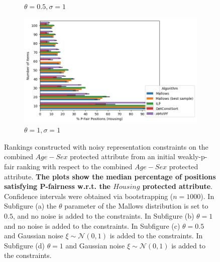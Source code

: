 \begin{figure}
\begin{subfigure}[b]{0.4\textwidth}
         \caption{$\theta = 0.5, \sigma=1$}
         \label{fig:01pfair}
     \end{subfigure}\quad
     \begin{subfigure}[b]{0.4\textwidth}
         \centering
         \includegraphics[width=\textwidth]{resources/11/p_pfair_hou.png}
         \caption{$\theta = 1, \sigma=1$}
         \label{fig:11pfair}
     \end{subfigure}\quad
  \caption{ 
  Rankings constructed with noisy representation constraints on the combined $Age-Sex$ protected attribute from an initial weakly-p-fair ranking with respect to the combined $Age-Sex$ protected attribute. \textbf{The plots show the median percentage of positions satisfying P-fairness w.r.t. the $Housing$ protected attribute}. Confidence intervals were obtained via bootstrapping ($n=1000$). In Subfigure (a) the $\theta$ parameter of the Mallows distribution is set to $0.5$, and no noise is added to the constraints. In Subfigure (b) $\theta=1$ and no noise is added to the constraints. In Subfigure (c) $\theta=0.5$ and Gaussian noise $\xi\sim \mathcal{N}(0,1)$ is added to the constraints. In Subfigure  (d) $\theta=1$ and Gaussian noise $\xi\sim \mathcal{N}(0,1)$ is added to the constraints.  
  }
  \label{plot:pfair_hous}
\end{figure}

